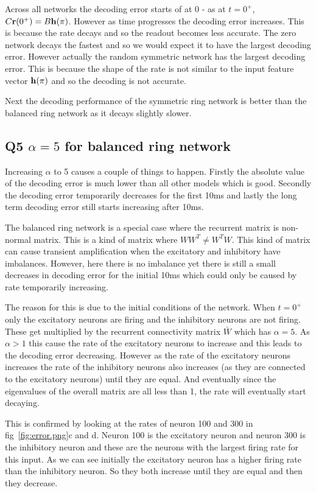 \documentclass[a4paper, 11pt, oneside]{report}
\begin{document}
Across all networks the decoding error starts of at 0 - as at $t=0^+$, $C\mathbf{r}(0^+)=B\mathbf{h}(\pi)$.
However as time progresses the decoding error increases. This is because the rate decays and so the readout becomes less accurate.
The zero network decays the fastest and so we would expect it to have the largest decoding error.
However actually the random symmetric network has the largest decoding error.
This is because the shape of the rate is not similar to the input feature vector $\mathbf{h}(\pi)$ and so the decoding is not accurate.

Next the decoding performance of the symmetric ring network is better than the balanced ring network
as it decays slightly slower.

\subsection*{Q5 $\alpha = 5$ for balanced ring network}

Increasing $\alpha$ to 5 causes a couple of things to happen.
Firstly the absolute value of the decoding error is much lower than all other models which is good.
Secondly the decoding error temporarily decreases for the first 10ms
and lastly the long term decoding error still starts increasing after 10ms.

The balanced ring network is a special case where the recurrent matrix is non-normal matrix.
This is a kind of matrix where $WW^T \neq W^TW$. This kind of matrix can cause transient amplification when the excitatory
and inhibitory have imbalances. However, here there is no imbalance yet there is still a small decreases in decoding
error for the initial 10ms which could only be caused by rate temporarily increasing.

The reason for this is due to the initial conditions of the network.
When $t=0^+$ only the excitatory neurons are firing and the inhibitory neurons are not firing.
These get multiplied by the recurrent connectivity matrix $\bar{W}$ which has $\alpha=5$.
As $\alpha>1$ this cause the rate of the excitatory neurons to increase and this leads to the decoding error decreasing.
However as the rate of the excitatory neurons increases the rate of the inhibitory neurons also increases (as they are connected to the excitatory neurons)
until they are equal.
And eventually since the eigenvalues of the overall matrix are all less than 1, the rate will eventually start decaying.

This is confirmed by looking at the rates of neuron 100 and 300 in fig~\ref{fig:error.png}c and d.
Neuron 100 is the excitatory neuron and neuron 300 is the inhibitory neuron and these are the neurons with the largest firing rate for this input.
As we can see initially the excitatory neuron has a higher firing rate than the inhibitory neuron.
So they both increase until they are equal and then they decrease.
\end{document}
